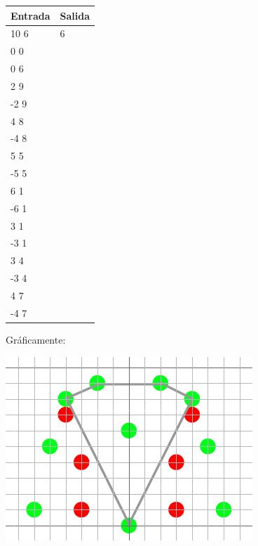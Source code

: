\begin{center}
    \begin{tabular}{| l | l |}
    \hline
    Entrada & Salida \\ \hline
	10 6 & 6 \\
	0 0 & \\
	0 6 & \\
	2 9 & \\
	-2 9 & \\
	4 8 & \\
	-4 8 & \\
	5 5 & \\
	-5 5 & \\
	6 1 & \\
	-6 1 & \\
	3 1 & \\
	-3 1 & \\
	3 4 & \\
	-3 4 & \\
	4 7 & \\
	-4 7 & \\
	\hline
    \end{tabular}
\end{center}

Gráficamente:

\includegraphics[scale=0.5]{img/ej3c4.png}